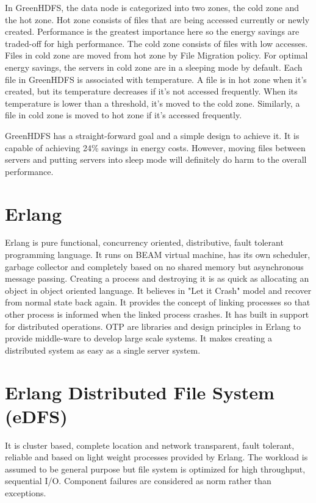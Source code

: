 \documentclass[a4paper,12pt]{article}
\begin{document}
In GreenHDFS, the data node is categorized into two zones, the cold zone and the hot zone. Hot zone consists of files that are being accessed currently or newly created. Performance is the greatest importance here so the energy savings are traded-off for high performance. The cold zone consists of files with low accesses. Files in cold zone are moved from hot zone by File Migration policy. For optimal energy savings, the servers in cold zone are in a sleeping mode by default. Each file in GreenHDFS is associated with temperature. A file is in hot zone when it’s created, but its temperature decreases if it’s not accessed frequently. When its temperature is lower than a threshold, it’s moved to the cold zone. Similarly, a file in cold zone is moved to hot zone if it’s accessed frequently. 

GreenHDFS has a straight-forward goal and a simple design to achieve it. It is capable of achieving 24\% savings in energy costs. However, moving files between servers and putting servers into sleep mode will definitely do harm to the overall performance.

\section{Erlang}
\label{sec:erlang}
Erlang is pure functional, concurrency oriented, distributive, fault tolerant programming language. It runs on BEAM virtual machine, has its own scheduler, garbage collector and completely based on no shared memory but asynchronous message passing. Creating a process and destroying it is as quick as allocating an object in object oriented language. It believes in "Let it Crash" model and recover from normal state back again. It provides the concept of linking processes so that other process is informed when the linked process crashes. It has built in support for distributed operations. OTP are libraries and design principles in Erlang to provide middle-ware to develop large scale systems. It makes creating a distributed system as easy as a single server system.

\section{Erlang Distributed File System (eDFS)}
\label{sec:edfs}
It is cluster based, complete location and network transparent, fault tolerant, reliable and based on light weight processes provided by Erlang. The workload is assumed to be general purpose but file system is optimized for high throughput, sequential I/O. Component failures are considered as norm rather than exceptions.
\end{document}
